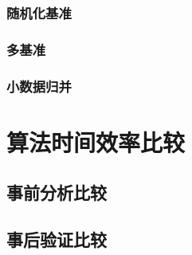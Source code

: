 \subsubsection{随机化基准}
\subsubsection{多基准}
\subsubsection{小数据归并}

\section{算法时间效率比较}
\subsection{事前分析比较}
\subsection{事后验证比较}
